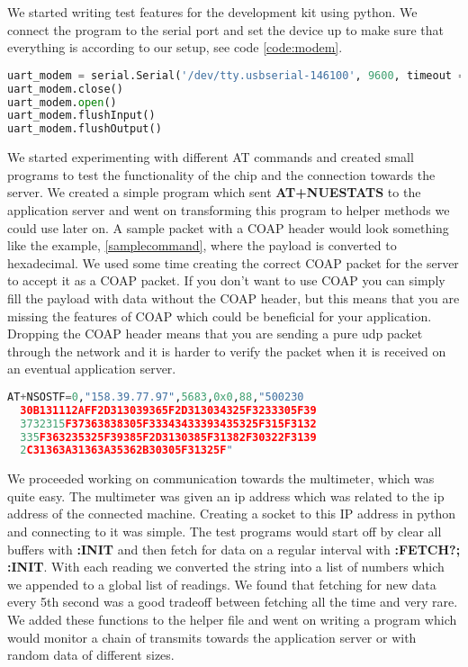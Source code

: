 \documentclass[USenglish]{ifimaster}  %
\begin{document}
We started writing test features for the development kit using python. We connect the program to the serial port and set the device up to make sure that everything is according to our setup, see code \vref{code:modem}.

\begin{lstlisting}[caption={Development kit initiation},label={code:modem},language=Python]
uart_modem = serial.Serial('/dev/tty.usbserial-146100', 9600, timeout = 0)
uart_modem.close()
uart_modem.open()
uart_modem.flushInput()
uart_modem.flushOutput()
\end{lstlisting}

We started experimenting with different AT commands and created small programs to test the functionality of the chip and the connection towards the server. We created a simple program which sent \textbf{AT+NUESTATS} to the application server and went on transforming this program to helper methods we could use later on. A sample packet with a COAP header would look something like the example, \vref{samplecommand}, where the payload is converted to hexadecimal. We used some time creating the correct COAP packet for the server to accept it as a COAP packet. If you don't want to use COAP you can simply fill the payload with data without the COAP header, but this means that you are missing the features of COAP which could be beneficial for your application. Dropping the COAP header means that you are sending a pure \acrshort{udp} packet through the network and it is harder to verify the packet when it is received on an eventual application server.

\begin{lstlisting}[caption={Sample transmit 158.39.77.97:5683, 88 bytes},label={samplecommand},language=Python]
  AT+NSOSTF=0,"158.39.77.97",5683,0x0,88,"500230
  30B131112AFF2D313039365F2D313034325F3233305F39
  3732315F37363838305F33343433393435325F315F3132
  335F363235325F39385F2D3130385F31382F30322F3139
  2C31363A31363A35362B30305F31325F"
\end{lstlisting}

We proceeded working on communication towards the multimeter, which was quite easy. The multimeter was given an \acrshort{ip} address which was related to the \acrshort{ip} address of the connected machine. Creating a socket to this IP address in python and connecting to it was simple. The test programs would start off by clear all buffers with \textbf{:INIT} and then fetch for data on a regular interval with \textbf{:FETCH?; :INIT}. With each reading we converted the string into a list of numbers which we appended to a global list of readings. We found that fetching for new data every 5th second was a good tradeoff between fetching all the time and very rare. We added these functions to the helper file and went on writing a program which would monitor a chain of transmits towards the application server or with random data of different sizes.
\end{document}
